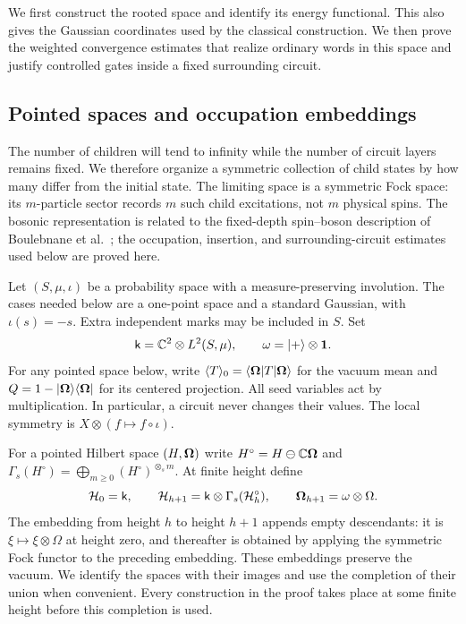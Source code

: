 We first construct the rooted space and identify its energy functional.
This also gives the Gaussian coordinates used by the classical
construction. We then prove the weighted convergence estimates that
realize ordinary words in this space and justify controlled gates inside
a fixed surrounding circuit.

\subsection{Pointed spaces and occupation embeddings}
\label{sec:pointed-spaces}

The number of children will tend to infinity while the number of
circuit layers remains fixed.  We therefore organize a symmetric
collection of child states by how many differ from the initial state.
The limiting space is a symmetric Fock space: its $m$-particle sector
records $m$ such child excitations, not $m$ physical spins.
The bosonic representation is related to the fixed-depth spin--boson
description of Boulebnane et al.~\cite{BKL2026}; the occupation,
insertion, and surrounding-circuit estimates used below are proved here.

Let $(S,\mu,\iota)$ be a probability space with a measure-preserving
involution.  The cases needed below are a one-point space and a
standard Gaussian, with $\iota(s)=-s$.  Extra independent marks may
be included in $S$.  Set
\[
 \mathsf k=\mathbb C^2\otimes L^2(S,\mu),\qquad
 \omega=\lvert +\rangle\otimes\mathbf 1.
\]
For any pointed space below, write $\langle T\rangle_0=
\langle \boldsymbol\Omega\rvert T\lvert \boldsymbol\Omega\rangle$ for the vacuum mean and
$Q=1-|\boldsymbol\Omega\rangle\langle\boldsymbol\Omega|$ for its centered projection.
All seed variables act by multiplication.  In particular, a circuit
never changes their values.  The local symmetry is
$X\otimes(f\mapsto f\circ\iota)$.

For a pointed Hilbert space $(H,\boldsymbol\Omega)$ write
$H^\circ=H\ominus\mathbb C\boldsymbol\Omega$ and
$\Gamma_s(H^\circ)=\bigoplus_{m\geq0}(H^\circ)^{\otimes_s m}$.
At finite height define
\begin{equation}\label{eq:recursive-spaces}
 \mathcal H_0=\mathsf k,\qquad
 \mathcal H_{h+1}=\mathsf k\otimes\Gamma_s(\mathcal H_h^\circ),\qquad
 \boldsymbol\Omega_{h+1}=\omega\otimes\Omega.
\end{equation}
The embedding from height $h$ to height $h+1$ appends empty
descendants: it is $\xi\mapsto\xi\otimes\Omega$ at height zero,
and thereafter is obtained by applying the symmetric Fock functor
to the preceding embedding.  These embeddings preserve the vacuum.
We identify the spaces with their images and use the completion of
their union when convenient.  Every construction in the proof takes
place at some finite height before this completion is used.

